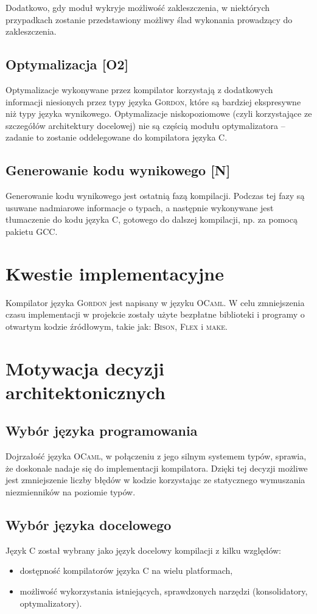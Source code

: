 \documentclass{documentation}
\begin{document}
Dodatkowo, gdy moduł wykryje możliwość zakleszczenia, w niektórych przypadkach
zostanie przedstawiony możliwy ślad wykonania prowadzący do zakleszczenia. 

\subsection{Optymalizacja [O2]}
\noindent Optymalizacje wykonywane przez kompilator korzystają z dodatkowych informacji
niesionych przez typy języka \textsc{Gordon}, które są bardziej ekspresywne niż typy języka
wynikowego.
Optymalizacje niskopoziomowe (czyli korzystające ze szczegółów architektury docelowej) nie
są częścią modułu optymalizatora -- zadanie to zostanie oddelegowane do kompilatora języka \textsc{C}.

\subsection{Generowanie kodu wynikowego [N]}
\noindent Generowanie kodu wynikowego jest ostatnią fazą kompilacji. Podczas tej
fazy są usuwane
nadmiarowe informacje o typach, a następnie wykonywane jest tłumaczenie do kodu języka
\textsc{C}, gotowego do dalszej kompilacji, np. za pomocą pakietu \textsc{GCC}.

\section{Kwestie implementacyjne}
\noindent Kompilator języka \textsc{Gordon} jest napisany w języku \textsc{OCaml}. W celu
zmniejszenia czasu implementacji w projekcie zostały użyte bezpłatne biblioteki i programy o otwartym
kodzie źródłowym, takie jak: \textsc{Bison}, \textsc{Flex} i \textsc{make}.

\section{Motywacja decyzji architektonicznych}
\subsection{Wybór języka programowania}
\noindent Dojrzałość języka \textsc{OCaml}, w połączeniu z jego silnym systemem typów,
sprawia, że doskonale nadaje się do implementacji kompilatora. Dzięki tej
decyzji możliwe jest zmniejszenie liczby błędów w kodzie korzystając ze
statycznego wymuszania niezmienników na poziomie typów.

\subsection{Wybór języka docelowego}
\noindent Język \textsc{C} został wybrany jako język docelowy kompilacji z kilku względów:
\begin{itemize}
    \item dostępność kompilatorów języka \textsc{C} na wielu platformach,
    \item możliwość wykorzystania istniejących, sprawdzonych narzędzi (konsolidatory,
        optymalizatory).
\end{itemize}
\end{document}
